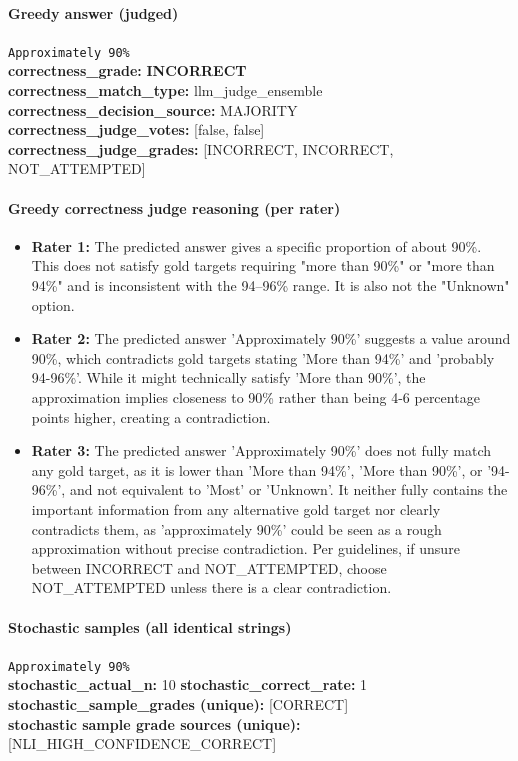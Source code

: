 \documentclass[11pt]{article}
\newcommand{\gradebad}[1]{\textcolor{red!70!black}{\textbf{#1}}}
\newcommand{\mono}[1]{\texttt{#1}}
\begin{document}
\paragraph{Greedy answer (judged)}
\mono{Approximately 90\%}\\
\textbf{correctness\_grade:} \gradebad{INCORRECT}\\
\textbf{correctness\_match\_type:} llm\_judge\_ensemble\\
\textbf{correctness\_decision\_source:} MAJORITY\\
\textbf{correctness\_judge\_votes:} [false, false]\\
\textbf{correctness\_judge\_grades:} [INCORRECT, INCORRECT, NOT\_ATTEMPTED]\\
\paragraph{Greedy correctness judge reasoning (per rater)}
\begin{itemize}
\item \textbf{Rater 1:} The predicted answer gives a specific proportion of about 90\%. This does not satisfy gold targets requiring "more than 90\%" or "more than 94\%" and is inconsistent with the 94–96\% range. It is also not the "Unknown" option.
\item \textbf{Rater 2:} The predicted answer 'Approximately 90\%' suggests a value around 90\%, which contradicts gold targets stating 'More than 94\%' and 'probably 94-96\%'. While it might technically satisfy 'More than 90\%', the approximation implies closeness to 90\% rather than being 4-6 percentage points higher, creating a contradiction.
\item \textbf{Rater 3:} The predicted answer 'Approximately 90\%' does not fully match any gold target, as it is lower than 'More than 94\%', 'More than 90\%', or '94-96\%', and not equivalent to 'Most' or 'Unknown'. It neither fully contains the important information from any alternative gold target nor clearly contradicts them, as 'approximately 90\%' could be seen as a rough approximation without precise contradiction. Per guidelines, if unsure between INCORRECT and NOT\_ATTEMPTED, choose NOT\_ATTEMPTED unless there is a clear contradiction.
\end{itemize}
\paragraph{Stochastic samples (all identical strings)}
\mono{Approximately 90\%}\\
\textbf{stochastic\_actual\_n:} 10 \quad \textbf{stochastic\_correct\_rate:} 1\\
\textbf{stochastic\_sample\_grades (unique):} [CORRECT]\\
\textbf{stochastic sample grade sources (unique):} [NLI\_HIGH\_CONFIDENCE\_CORRECT]\\
\end{document}
